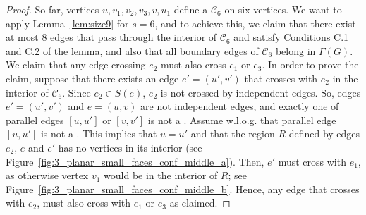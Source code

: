 \begin{proof}

So far, vertices $u,v_1,v_2,v_3,v,u_1$ define a \pp $\mathcal{C}_6$ on six vertices. We want to apply Lemma~\ref{lem:size9} for $s=6$, and to achieve this, we claim that there exist at most $8$ edges that pass through the interior of $\mathcal{C}_6$ and satisfy Conditions C.1 and C.2 of the lemma, and also that all boundary edges of $\mathcal{C}_6$ belong in $\Gamma(G)$. We claim that any edge crossing $e_2$ must also cross $e_1$ or $e_3$. In order to prove the claim, suppose that there exists an edge $e'=(u',v')$ that crosses with $e_2$ in the interior of $\mathcal{C}_6$. Since $e_2\in S(e)$, $e_2$ is not crossed by independent edges. So, edges $e'=(u',v')$ and $e=(u,v)$ are not independent edges, and exactly one of parallel edges $[u,u']$ or $[v,v']$ is not a \pe. Assume w.l.o.g. that parallel edge $[u,u']$ is not a \pe. This implies that $u=u'$ and that the region $R$ defined by edges $e_2$, $e$ and $e'$ has no vertices in its interior (see Figure~\ref{fig:3_planar_small_faces_conf_middle_a}). Then, $e'$ must cross with $e_1$, as otherwise vertex $v_1$ would be in the interior of $R$; see Figure~\ref{fig:3_planar_small_faces_conf_middle_b}. Hence, any edge that crosses with $e_2$, must also cross with $e_1$ or $e_3$ as claimed. 


\end{proof}
